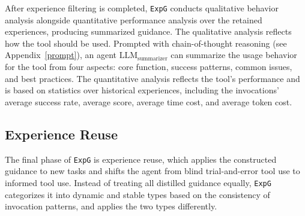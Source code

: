 \documentclass[11pt]{article}
\newcommand{\ours}{\texttt{ExpG}}
\begin{document}
After experience filtering is completed, {\ours} conducts qualitative behavior analysis alongside quantitative performance analysis over the retained experiences, producing summarized guidance. The qualitative analysis reflects how the tool should be used. Prompted with chain-of-thought reasoning (see Appendix~\ref{prompt}), an agent $\mathrm{LLM}_{\mathrm{summarizer}}$ can summarize the usage behavior for the tool from four aspects: core function, success patterns, common issues, and best practices. The quantitative analysis reflects the tool's performance and is based on statistics over historical experiences, including the invocations' average success rate, average score, average time cost, and average token cost. 

\subsection{Experience Reuse}\label{sec:refinement}
The final phase of {\ours} is experience reuse, which applies the constructed guidance to new tasks and shifts the agent from blind trial-and-error tool use to informed tool use. Instead of treating all distilled guidance equally, {\ours} categorizes it into dynamic and stable types based on the consistency of invocation patterns, and applies the two types differently. 
\end{document}
